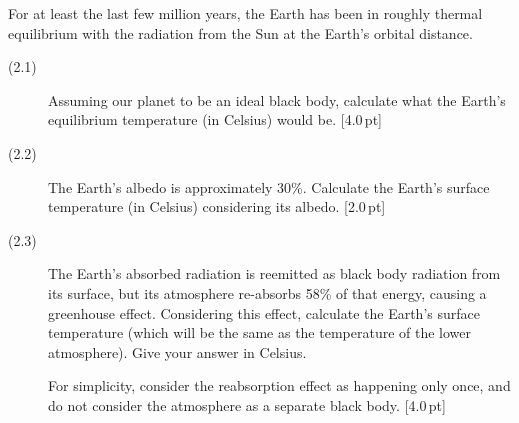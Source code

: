 For at least the last few million years, the Earth has been in roughly
thermal equilibrium with the radiation from the Sun at the Earth's orbital
distance.

\begin{description}
\item[(2.1)] Assuming our planet to be an ideal black body, calculate what
  the Earth's equilibrium temperature (in Celsius) would be.
  \hfill[4.0\,pt]
\item[(2.2)] The Earth's albedo is approximately 30\%. Calculate the Earth's
  surface temperature (in Celsius) considering its albedo. \hfill[2.0\,pt]
\item[(2.3)] The Earth's absorbed radiation is reemitted as black body
  radiation from its surface, but its atmosphere re-absorbs 58\% of that
  energy, causing a greenhouse effect. Considering this effect, calculate the
  Earth's surface temperature (which will be the same as the temperature of
  the lower atmosphere). Give your answer in Celsius.

  For simplicity, consider the reabsorption effect as happening only once,
  and do not consider the atmosphere as a separate black body.
  \hfill[4.0\,pt]
\end{description}
